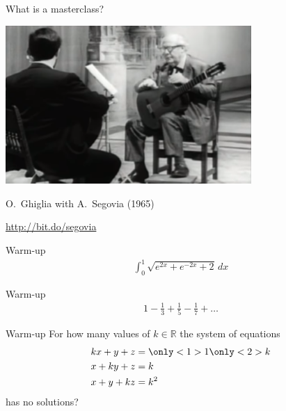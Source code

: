 \documentclass[onepage, 12pt]{beamer}
\providecommand{\IR}{\mathbb{R}}
\begin{document}


\begin{frame}[t]{What is a masterclass?}{}
    \begin{center}
        \includegraphics[width=0.7\textwidth]{../../ORIGINALS/lMhqqEfiO3Q}
        
        {%
            O.~Ghiglia with A.~Segovia (1965)
            
            \small\url{http://bit.do/segovia}
        }
    \end{center}
\end{frame}




\begin{frame}[t]{\color{gray} Warm-up}{}
    \begin{align*}
        \int_0^1
        \sqrt{
            e^{2x} + e^{-2x} + 2
        } \, dx
    \end{align*}
\end{frame}




\begin{frame}[t]{\color{gray} Warm-up}{}
    \begin{align*}
        1 - \frac13 + \frac15 - \frac17 + \ldots
    \end{align*}
\end{frame}




\begin{frame}[t]{\color{gray} Warm-up}{}
    For how many values of $k \in \IR$ 
    the system of equations
    \begin{align*}
        k x + y + z & = \only<1>{1} \only<2>{k} \\
        x + k y + z & = k \\
        x + y + k z & = k^2
    \end{align*}
    has no solutions?
\end{frame}
\end{document}
